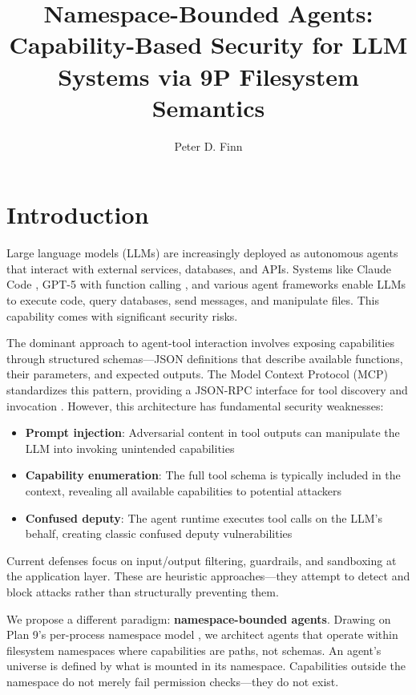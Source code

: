 \documentclass[acmsmall,screen,review]{acmart}
\title[Namespace-Bounded Agents]{Namespace-Bounded Agents: Capability-Based Security for LLM Systems via 9P Filesystem Semantics}
\author{Peter D. Finn}
\affiliation{%
  \institution{King's College London}
  \city{London}
  \country{United Kingdom}
}
\affiliation{%
  \institution{NERV Systems}
  \country{USA}
}
\begin{document}
\maketitle




\section{Introduction}
\label{sec:introduction}

Large language models (LLMs) are increasingly deployed as autonomous agents that interact with external services, databases, and APIs. Systems like Claude Code \cite{anthropic2025claudecode}, GPT-5 with function calling \cite{openai2025functioncalling}, and various agent frameworks enable LLMs to execute code, query databases, send messages, and manipulate files. This capability comes with significant security risks.

The dominant approach to agent-tool interaction involves exposing capabilities through structured schemas---JSON definitions that describe available functions, their parameters, and expected outputs. The Model Context Protocol (MCP) standardizes this pattern, providing a JSON-RPC interface for tool discovery and invocation \cite{anthropic2024mcp}. However, this architecture has fundamental security weaknesses:

\begin{itemize}
    \item \textbf{Prompt injection}: Adversarial content in tool outputs can manipulate the LLM into invoking unintended capabilities \cite{greshake2023prompt}
    \item \textbf{Capability enumeration}: The full tool schema is typically included in the context, revealing all available capabilities to potential attackers
    \item \textbf{Confused deputy}: The agent runtime executes tool calls on the LLM's behalf, creating classic confused deputy vulnerabilities
\end{itemize}

Current defenses focus on input/output filtering, guardrails, and sandboxing at the application layer. These are heuristic approaches---they attempt to detect and block attacks rather than structurally preventing them.

We propose a different paradigm: \textbf{namespace-bounded agents}. Drawing on Plan 9's per-process namespace model \cite{pike1990plan9}, we architect agents that operate within filesystem namespaces where capabilities are paths, not schemas. An agent's universe is defined by what is mounted in its namespace. Capabilities outside the namespace do not merely fail permission checks---they do not exist.
\end{document}

